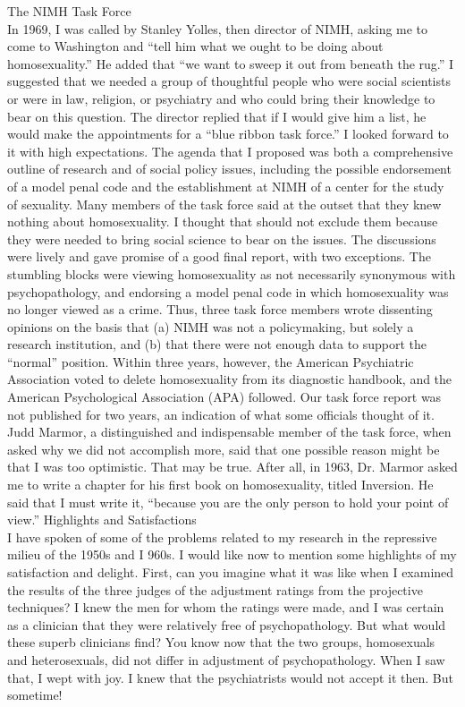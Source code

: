 The NIMH Task Force\\
In 1969, I was called by Stanley Yolles, then director of NIMH, asking me to come to Washington and ``tell him what we ought to be doing about homosexuality.'' He added that ``we want to sweep it out from beneath the rug.'' I suggested that we needed a group of thoughtful people who were social scientists or were in law, religion, or psychiatry and who could bring their knowledge to bear on this question. The director replied that if I would give him a list, he would make the appointments for a ``blue ribbon task force.'' I looked forward to it with high expectations.
The agenda that I proposed was both a comprehensive outline of research and of social policy issues, including the possible endorsement of a model penal code and the establishment at NIMH of a center for the study of sexuality. Many members of the task force said at the outset that they knew nothing about homosexuality. I thought that should not exclude them because they were needed to bring social science to bear on the issues. The discussions were lively and gave promise of a good final report, with two exceptions.
The stumbling blocks were viewing homosexuality as not necessarily synonymous with psychopathology, and endorsing a model penal code in which homosexuality was no longer viewed as a crime. Thus, three task force members wrote dissenting opinions on the basis that (a) NIMH was not a policymaking, but solely a research institution, and (b) that there were not enough data to support the ``normal'' position. Within three years, however, the American Psychiatric Association voted to delete homosexuality from its diagnostic handbook, and the American Psychological Association (APA) followed.
Our task force report was not published for two years, an indication of what some officials thought of it. Judd Marmor, a distinguished and indispensable member of the task force, when asked why we did not accomplish more, said that one possible reason might be that I was too optimistic. That may be true. After all, in 1963, Dr. Marmor asked me to write a chapter for his first book on homosexuality, titled Inversion. He said that I must write it, ``because you are the only person to hold your point of view.''
Highlights and Satisfactions\\
I have spoken of some of the problems related to my research in the repressive milieu of the 1950s and I 960s. I would like now to mention some highlights of my satisfaction and delight.
First, can you imagine what it was like when I examined the results of the three judges of the adjustment ratings from the projective techniques? I knew the men for whom the ratings were made, and I was certain as a clinician that they were relatively free of psychopathology. But what would these superb clinicians find? You know now that the two groups, homosexuals and heterosexuals, did not differ in adjustment of psychopathology. When I saw that, I wept with joy. I knew that the psychiatrists would not accept it then. But sometime!
